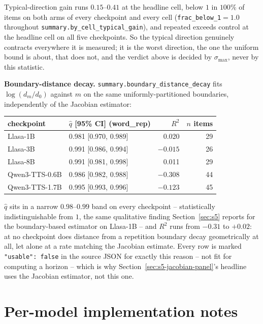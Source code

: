 \documentclass[11pt]{article}
\begin{document}
Typical-direction gain runs $0.15$--$0.41$ at the headline cell, below $1$ in
$100\%$ of items on both arms of every checkpoint and every cell
(\texttt{frac\_below\_1}$=1.0$ throughout \texttt{summary.by\_cell\_typical\_gain}),
and repeated exceeds control at the headline cell on all five checkpoints. So
the typical direction genuinely contracts everywhere it is measured; it is the
worst direction, the one the uniform bound is about, that does not, and the
verdict above is decided by $\sigma_{\max}$, never by this statistic.

\noindent\textbf{Boundary-distance decay.} \texttt{summary.boundary\_distance\_decay}
fits $\log(d_m/d_0)$ against $m$ on the same uniformly-partitioned boundaries,
independently of the Jacobian estimator:

\begin{center}
\begin{tabular}{lp{2.6cm}rr}
\toprule
checkpoint & $\hat q$ [95\% CI] (word\_rep) & $R^2$ & $n$ items \\
\midrule
Llasa-1B & 0.981 [0.970, 0.989] & 0.020 & 29 \\
Llasa-3B & 0.991 [0.986, 0.994] & $-0.015$ & 26 \\
Llasa-8B & 0.991 [0.981, 0.998] & 0.011 & 29 \\
Qwen3-TTS-0.6B & 0.986 [0.982, 0.988] & $-0.308$ & 44 \\
Qwen3-TTS-1.7B & 0.995 [0.993, 0.996] & $-0.123$ & 45 \\
\bottomrule
\end{tabular}
\end{center}

$\hat q$ sits in a narrow $0.98$--$0.99$ band on every checkpoint --
statistically indistinguishable from $1$, the same qualitative finding
Section~\ref{sec:s5} reports for the boundary-based estimator on Llasa-1B --
and $R^2$ runs from $-0.31$ to $+0.02$: at no checkpoint does distance from a
repetition boundary decay geometrically at all, let alone at a rate matching
the Jacobian estimate. Every row is marked \texttt{"usable": false} in the
source JSON for exactly this reason -- not fit for computing a horizon --
which is why Section~\ref{sec:s5-jacobian-panel}'s headline uses the Jacobian
estimator, not this one.

\section{Per-model implementation notes}
\label{sec:s6}
\end{document}
